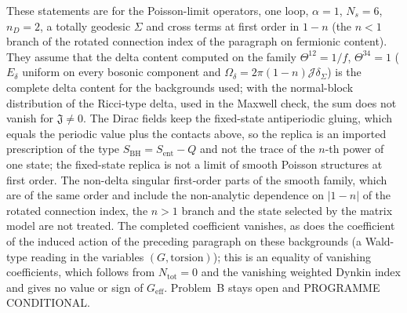 These statements are for the Poisson-limit operators, one loop, \(\alpha=1\), \(N_s=6\), \(n_D=2\), a totally geodesic \(\Sigma\) and cross terms at first order in \(1-n\) (the \(n<1\) branch of the rotated connection index of the paragraph on fermionic content). They assume that the delta content computed on the family \(\Theta^{12}=1/f\), \(\Theta^{34}=1\) (\(E_\delta\) uniform on every bosonic component and \(\Omega_\delta=2\pi(1-n)\mathcal J\delta_\Sigma\)) is the complete delta content for the backgrounds used; with the normal-block distribution of the Ricci-type delta, used in the Maxwell check, the sum does not vanish for \(\mathfrak J\neq0\). The Dirac fields keep the fixed-state antiperiodic gluing, which equals the periodic value plus the contacts above, so the replica is an imported prescription of the type \(S_{\mathrm{BH}}=S_{\mathrm{ent}}-Q\) and not the trace of the \(n\)-th power of one state; the fixed-state replica is not a limit of smooth Poisson structures at first order. The non-delta singular first-order parts of the smooth family, which are of the same order and include the non-analytic dependence on \(|1-n|\) of the rotated connection index, the \(n>1\) branch and the state selected by the matrix model are not treated. The completed coefficient vanishes, as does the coefficient of the induced action of the preceding paragraph on these backgrounds (a Wald-type reading in the variables \((G,\text{torsion})\)); this is an equality of vanishing coefficients, which follows from \(N_{\mathrm{tot}}=0\) and the vanishing weighted Dynkin index and gives no value or sign of \(G_{\mathrm{eff}}\). Problem~B stays open and PROGRAMME CONDITIONAL.

